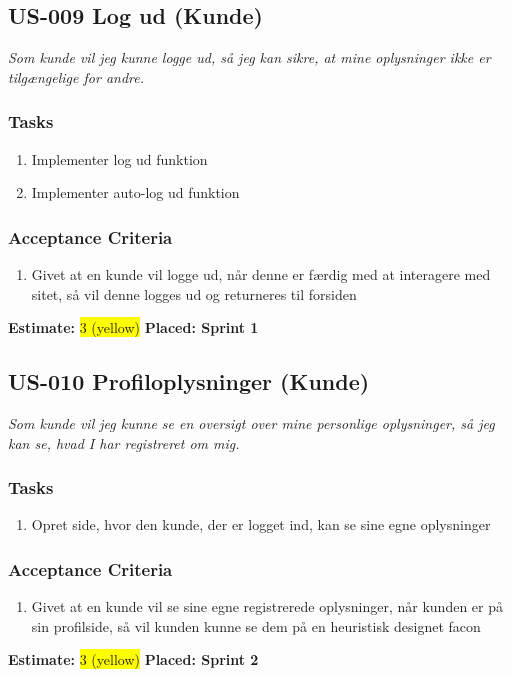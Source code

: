 \subsection{US-009 Log ud (Kunde)}
\label{sec:US-009}
\textit{Som kunde vil jeg kunne logge ud, så jeg kan sikre, at mine oplysninger ikke er tilgængelige for andre.}
\subsubsection*{\textbf{Tasks}}
\begin{enumerate}
  \item Implementer log ud funktion
  \item Implementer auto-log ud funktion
\end{enumerate}
\subsubsection*{\textbf{Acceptance Criteria}}
\begin{enumerate}
  \item Givet at en kunde vil logge ud, når denne er færdig med at interagere med sitet, så vil denne logges ud og returneres til forsiden
\end{enumerate}
\textbf{Estimate:} \colorbox{yellow}{3 (yellow)}
\textbf{Placed: Sprint 1}
\par\noindent\dotfill

\subsection{US-010 Profiloplysninger (Kunde)}
\label{sec:US-010}
\textit{Som kunde vil jeg kunne se en oversigt over mine personlige oplysninger, så jeg kan se, hvad I har registreret om mig.}
\subsubsection*{\textbf{Tasks}}
\begin{enumerate}
  \item Opret side, hvor den kunde, der er logget ind, kan se sine egne oplysninger
\end{enumerate}
\subsubsection*{\textbf{Acceptance Criteria}}
\begin{enumerate}
  \item Givet at en kunde vil se sine egne registrerede oplysninger, når kunden er på sin profilside, så vil kunden kunne se dem på en heuristisk designet facon
\end{enumerate}
\textbf{Estimate:} \colorbox{yellow}{3 (yellow)}
\textbf{Placed: Sprint 2}
\par\noindent\dotfill

